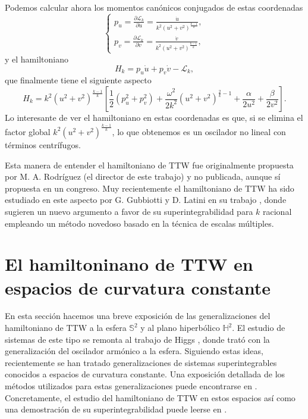\documentclass[12pt,a4paper,twoside]{article}
\theoremstyle{definition} \newtheorem{defn}[thm]{Definición}
\theoremstyle{definition} \newtheorem{ejemplo}[thm]{Ejemplo}
\theoremstyle{definition} \newtheorem{ejercicio}[thm]{Ejercicio}
\theoremstyle{remark} \newtheorem*{obs}{Observación}
\begin{document}
Podemos calcular ahora los momentos canónicos conjugados de estas coordenadas
\begin{equation}
  \begin{cases}
    p_u=\frac{\partial \mathcal{L} _k}{\partial \dot{u}}=\frac{\dot{u}}{k^2 (u^2+v^2)^{\frac{k-1}{k}}}, \\
    p_v=\frac{\partial \mathcal{L} _k}{\partial \dot{v}}=\frac{\dot{v}}{k^2 (u^2+v^2)^{\frac{k-1}{k}}},
  \end{cases}
\end{equation}
y el hamiltoniano
\begin{equation*}
  H_k=p_u \dot{u} + p_v \dot{v} - \mathcal{L}_k,
\end{equation*}
que finalmente tiene el siguiente aspecto
\begin{equation}
  H_k = k^2 (u^2+v^2)^{\frac{k-1}{k}}\left[ \frac{1}{2}(p_u^2+p_v^2)+ \frac{\omega^2}{2k^2}(u^2+v^2)^{\frac{2}{k}-1}+\frac{\alpha}{2u^2}+\frac{\beta}{2 v^2} \right]. 
\end{equation}
Lo interesante de ver el hamiltoniano en estas coordenadas es que, si se elimina el factor global $k^2(u^2+v^2)^{\frac{k-1}{k}}$, lo que obtenemos es un oscilador no lineal con términos centrífugos.

Esta manera de entender el hamiltoniano de TTW fue originalmente propuesta por M. A. Rodríguez (el director de este trabajo) y no publicada, aunque sí propuesta en un congreso. Muy recientemente el hamiltoniano de TTW ha sido estudiado en este aspecto por G. Gubbiotti y D. Latini en su trabajo \cite{gubbiottilatini}, donde sugieren un nuevo argumento a favor de su superintegrabilidad para $k$ racional empleando un método novedoso basado en la técnica de escalas múltiples.

\section{El hamiltoninano de TTW en espacios de curvatura constante}
En esta sección hacemos una breve exposición de las generalizaciones del hamiltoniano de TTW a la esfera $\mathbb{S} ^2$ y al plano hiperbólico $\mathbb{H} ^2.$ El estudio de sistemas de este tipo se remonta al trabajo de Higgs \cite{higgs}, donde trató con la generalización del oscilador armónico a la esfera. Siguiendo estas ideas, recientemente se han tratado generalizaciones de sistemas superintegrables conocidos a espacios de curvatura constante. Una exposición detallada de los métodos utilizados para estas generalizaciones puede encontrarse en \cite{ballesteros}. Concretamente, el estudio del hamiltoniano de TTW en estos espacios así como una demostración de su superintegrabilidad puede leerse en \cite{ranada}.
\end{document}
